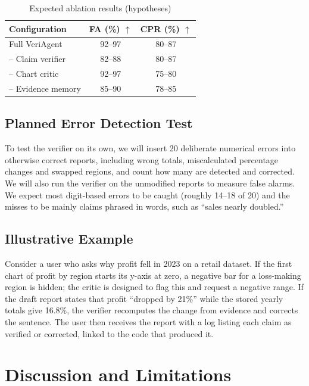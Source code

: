 \documentclass[conference]{IEEEtran}
\begin{document}
\begin{table}[t]
\centering
\caption{Expected ablation results (hypotheses)}
\label{tab:ablation}
\begin{tabular}{@{}lcc@{}}
\toprule
Configuration & FA (\%) $\uparrow$ & CPR (\%) $\uparrow$ \\
\midrule
Full VeriAgent             & 92--97 & 80--87 \\
\quad -- Claim verifier    & 82--88 & 80--87 \\
\quad -- Chart critic      & 92--97 & 75--80 \\
\quad -- Evidence memory   & 85--90 & 78--85 \\
\bottomrule
\end{tabular}
\end{table}

\subsection{Planned Error Detection Test}
To test the verifier on its own, we will insert 20 deliberate numerical errors into otherwise correct reports, including wrong totals, miscalculated percentage changes and swapped regions, and count how many are detected and corrected. We will also run the verifier on the unmodified reports to measure false alarms. We expect most digit-based errors to be caught (roughly 14--18 of 20) and the misses to be mainly claims phrased in words, such as ``sales nearly doubled.''

\subsection{Illustrative Example}
Consider a user who asks why profit fell in 2023 on a retail dataset. If the first chart of profit by region starts its y-axis at zero, a negative bar for a loss-making region is hidden; the critic is designed to flag this and request a negative range. If the draft report states that profit ``dropped by 21\%'' while the stored yearly totals give 16.8\%, the verifier recomputes the change from evidence and corrects the sentence. The user then receives the report with a log listing each claim as verified or corrected, linked to the code that produced it.

\section{Discussion and Limitations}
\end{document}
